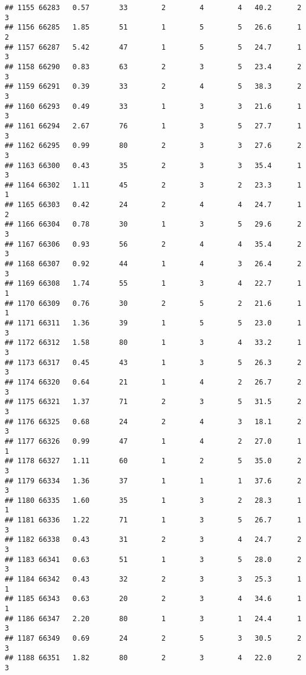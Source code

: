 \documentclass[
]{article}
\begin{document}
\begin{verbatim}
## 1155 66283   0.57       33        2        4        4   40.2      2      3
## 1156 66285   1.85       51        1        5        5   26.6      1      2
## 1157 66287   5.42       47        1        5        5   24.7      1      3
## 1158 66290   0.83       63        2        3        5   23.4      2      3
## 1159 66291   0.39       33        2        4        5   38.3      2      3
## 1160 66293   0.49       33        1        3        3   21.6      1      3
## 1161 66294   2.67       76        1        3        5   27.7      1      3
## 1162 66295   0.99       80        2        3        3   27.6      2      3
## 1163 66300   0.43       35        2        3        3   35.4      1      3
## 1164 66302   1.11       45        2        3        2   23.3      1      1
## 1165 66303   0.42       24        2        4        4   24.7      1      2
## 1166 66304   0.78       30        1        3        5   29.6      2      3
## 1167 66306   0.93       56        2        4        4   35.4      2      3
## 1168 66307   0.92       44        1        4        3   26.4      2      3
## 1169 66308   1.74       55        1        3        4   22.7      1      1
## 1170 66309   0.76       30        2        5        2   21.6      1      1
## 1171 66311   1.36       39        1        5        5   23.0      1      3
## 1172 66312   1.58       80        1        3        4   33.2      1      3
## 1173 66317   0.45       43        1        3        5   26.3      2      3
## 1174 66320   0.64       21        1        4        2   26.7      2      3
## 1175 66321   1.37       71        2        3        5   31.5      2      3
## 1176 66325   0.68       24        2        4        3   18.1      2      3
## 1177 66326   0.99       47        1        4        2   27.0      1      1
## 1178 66327   1.11       60        1        2        5   35.0      2      3
## 1179 66334   1.36       37        1        1        1   37.6      2      3
## 1180 66335   1.60       35        1        3        2   28.3      1      1
## 1181 66336   1.22       71        1        3        5   26.7      1      3
## 1182 66338   0.43       31        2        3        4   24.7      2      3
## 1183 66341   0.63       51        1        3        5   28.0      2      3
## 1184 66342   0.43       32        2        3        3   25.3      1      1
## 1185 66343   0.63       20        2        3        4   34.6      1      1
## 1186 66347   2.20       80        1        3        1   24.4      1      3
## 1187 66349   0.69       24        2        5        3   30.5      2      3
## 1188 66351   1.82       80        2        3        4   22.0      2      3

\end{verbatim}
\end{document}
